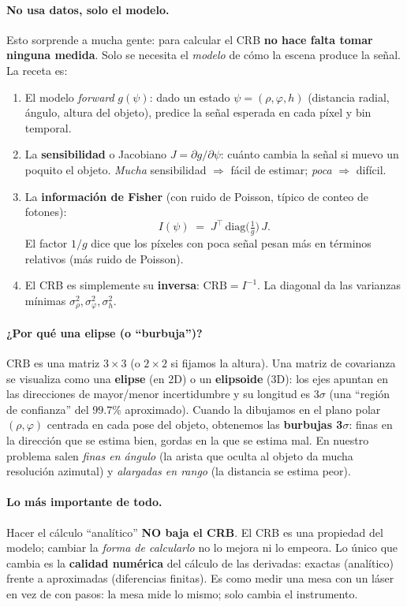 \documentclass[11pt,a4paper]{article}
\begin{document}
\paragraph{No usa datos, solo el modelo.} Esto sorprende a mucha gente: para
calcular el CRB \textbf{no hace falta tomar ninguna medida}. Solo se necesita el
\emph{modelo} de c\'omo la escena produce la se\~nal. La receta es:
\begin{enumerate}[nosep]
  \item El modelo \emph{forward} $g(\psi)$: dado un estado
  $\psi=(\rho,\varphi,h)$ (distancia radial, \'angulo, altura del objeto),
  predice la se\~nal esperada en cada p\'ixel y bin temporal.
  \item La \textbf{sensibilidad} o Jacobiano $J=\partial g/\partial\psi$: cu\'anto
  cambia la se\~nal si muevo un poquito el objeto. \emph{Mucha} sensibilidad
  $\Rightarrow$ f\'acil de estimar; \emph{poca} $\Rightarrow$ dif\'icil.
  \item La \textbf{informaci\'on de Fisher} (con ruido de Poisson, t\'ipico de
  conteo de fotones):
  \[
     I(\psi) \;=\; J^{\top}\,\mathrm{diag}\!\Big(\tfrac{1}{g}\Big)\,J .
  \]
  El factor $1/g$ dice que los p\'ixeles con poca se\~nal pesan m\'as en t\'erminos
  relativos (m\'as ruido de Poisson).
  \item El CRB es simplemente su \textbf{inversa}: $\mathrm{CRB}=I^{-1}$. La
  diagonal da las varianzas m\'inimas $\sigma_\rho^2,\sigma_\varphi^2,\sigma_h^2$.
\end{enumerate}

\paragraph{¿Por qu\'e una elipse (o ``burbuja'')?} $\mathrm{CRB}$ es una matriz
$3\times3$ (o $2\times2$ si fijamos la altura). Una matriz de covarianza se
visualiza como una \textbf{elipse} (en 2D) o un \textbf{elipsoide} (3D): los ejes
apuntan en las direcciones de mayor/menor incertidumbre y su longitud es
$3\sigma$ (una ``regi\'on de confianza'' del $99.7\%$ aproximado). Cuando la
dibujamos en el plano polar $(\rho,\varphi)$ centrada en cada pose del objeto,
obtenemos las \textbf{burbujas 3$\sigma$}: finas en la direcci\'on que se estima
bien, gordas en la que se estima mal. En nuestro problema salen \emph{finas en
\'angulo} (la arista que oculta al objeto da mucha resoluci\'on azimutal) y
\emph{alargadas en rango} (la distancia se estima peor).

\paragraph{Lo m\'as importante de todo.} Hacer el c\'alculo ``anal\'itico''
\textbf{NO baja el CRB}. El CRB es una propiedad del modelo; cambiar la
\emph{forma de calcularlo} no lo mejora ni lo empeora. Lo \'unico que cambia es la
\textbf{calidad num\'erica} del c\'alculo de las derivadas: exactas (anal\'itico)
frente a aproximadas (diferencias finitas). Es como medir una mesa con un
l\'aser en vez de con pasos: la mesa mide lo mismo; solo cambia el instrumento.
\end{document}
